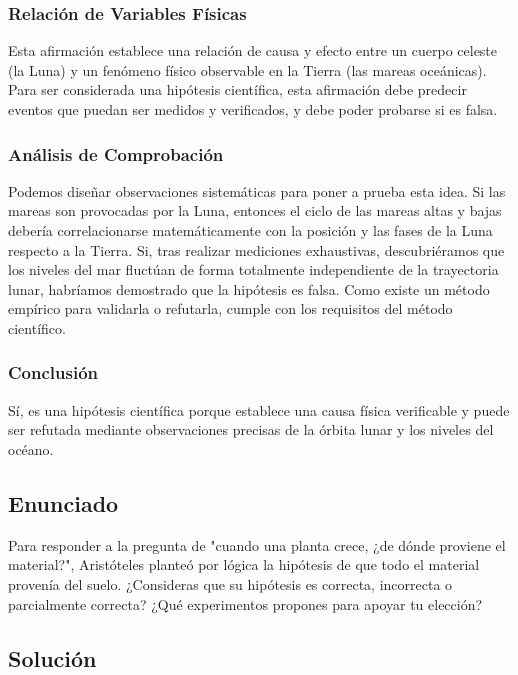 \documentclass[12pt,letterpaper]{article}
\begin{document}
\subsubsection*{Relación de Variables Físicas}
Esta afirmación establece una relación de causa y efecto entre un cuerpo celeste (la Luna) y un fenómeno físico observable en la Tierra (las mareas oceánicas). Para ser considerada una hipótesis científica, esta afirmación debe predecir eventos que puedan ser medidos y verificados, y debe poder probarse si es falsa.

\subsubsection*{Análisis de Comprobación}
Podemos diseñar observaciones sistemáticas para poner a prueba esta idea. Si las mareas son provocadas por la Luna, entonces el ciclo de las mareas altas y bajas debería correlacionarse matemáticamente con la posición y las fases de la Luna respecto a la Tierra. Si, tras realizar mediciones exhaustivas, descubriéramos que los niveles del mar fluctúan de forma totalmente independiente de la trayectoria lunar, habríamos demostrado que la hipótesis es falsa. Como existe un método empírico para validarla o refutarla, cumple con los requisitos del método científico.

\subsubsection*{Conclusión}
Sí, es una hipótesis científica porque establece una causa física verificable y puede ser refutada mediante observaciones precisas de la órbita lunar y los niveles del océano.

\newpage

\subsection*{Enunciado}
Para responder a la pregunta de "cuando una planta crece, ¿de dónde proviene el material?", Aristóteles planteó por lógica la hipótesis de que todo el material provenía del suelo. ¿Consideras que su hipótesis es correcta, incorrecta o parcialmente correcta? ¿Qué experimentos propones para apoyar tu elección?

\subsection*{Solución}
\end{document}
